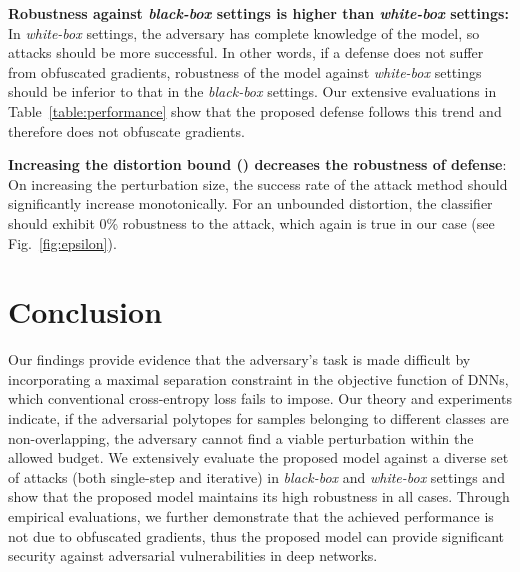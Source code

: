 \documentclass[10pt,twocolumn,letterpaper]{article}
\begin{document}
\noindent
\textbf{Robustness against \textit{black-box} settings is higher than \textit{white-box} settings:} In \textit{white-box} settings, the adversary has complete knowledge of the model, so attacks should be more successful. In other words, if a defense does not suffer from obfuscated gradients, robustness of the model against \textit{white-box} settings should be inferior to that in the \textit{black-box} settings. Our extensive evaluations in Table~\ref{table:performance} show that the proposed defense follows this trend and therefore does not obfuscate gradients. 

\noindent
\textbf{Increasing the distortion bound () decreases the robustness of defense}: On increasing the perturbation size, the success rate of the attack method should significantly increase monotonically. For an unbounded distortion, the classifier should exhibit 0\% robustness to the attack, which again is true in our case (see Fig.~\ref{fig:epsilon}).













\vspace{-0.35em}
\section{Conclusion}
\vspace{-0.5em}
Our findings provide evidence that the adversary's task is made difficult by incorporating a maximal separation constraint in the objective function of DNNs, which conventional cross-entropy loss fails to impose. Our theory and experiments indicate, if the adversarial polytopes for samples belonging to different classes are non-overlapping, the adversary cannot find a viable perturbation within the allowed budget. We extensively evaluate the proposed model against a diverse set of attacks (both single-step and iterative) in \textit{black-box} and \textit{white-box} settings and show that the proposed model maintains its high robustness in all cases. Through empirical evaluations, we further demonstrate that the achieved performance is not due to obfuscated gradients, thus the proposed model can provide significant security against adversarial vulnerabilities in deep networks. 

































{\small


}
\end{document}
